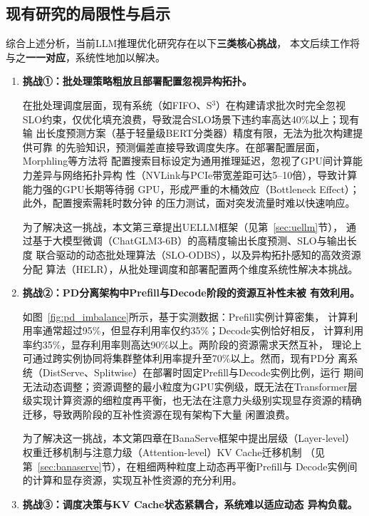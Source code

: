 \subsection{现有研究的局限性与启示}
\label{sec:limitations}

综合上述分析，当前LLM推理优化研究存在以下\textbf{三类核心挑战}，
本文后续工作将与之\textbf{一一对应}，系统性地加以解决。

\begin{enumerate}

\item \textbf{挑战①：批处理策略粗放且部署配置忽视异构拓扑。}

在批处理调度层面，现有系统（如FIFO、S$^3$）在构建请求批次时完全忽视
SLO约束，仅优化填充浪费，导致混合SLO场景下违约率高达40\%以上；现有输
出长度预测方案（基于轻量级BERT分类器）精度有限，无法为批次构建提供可靠
的先验知识，预测偏差直接导致调度失序。在部署配置层面，Morphling等方法将
配置搜索目标设定为通用推理延迟，忽视了GPU间计算能力差异与网络拓扑异构
性（NVLink与PCIe带宽差距可达5--10倍），导致计算能力强的GPU长期等待弱
GPU，形成严重的木桶效应（Bottleneck Effect）；此外，配置搜索需耗时数分钟
的压力测试，面对突发流量时难以快速响应。

为了解决这一挑战，本文第三章提出UELLM框架（见第~\ref{sec:uellm}节），
通过基于大模型微调（ChatGLM3-6B）的高精度输出长度预测、SLO与输出长度
联合驱动的动态批处理算法（SLO-ODBS），以及异构拓扑感知的高效资源分配
算法（HELR），从批处理调度和部署配置两个维度系统性解决本挑战。

\item \textbf{挑战②：PD分离架构中Prefill与Decode阶段的资源互补性未被
有效利用。}

如图~\ref{fig:pd_imbalance}所示，基于实测数据：Prefill实例计算密集，
计算利用率通常超过95\%，但显存利用率仅约35\%；Decode实例恰好相反，
计算利用率约35\%，显存利用率则高达90\%以上。两阶段的资源需求天然互补，
理论上可通过跨实例协同将集群整体利用率提升至70\%以上。然而，现有PD分
离系统（DistServe、Splitwise）在部署时固定Prefill与Decode实例比例，运行
期间无法动态调整；资源调整的最小粒度为GPU实例级，既无法在Transformer层
级实现计算资源的细粒度再平衡，也无法在注意力头级别实现显存资源的精确迁移，导致两阶段的互补性资源在现有架构下大量
闲置浪费。

为了解决这一挑战，本文第四章在BanaServe框架中提出层级（Layer-level）
权重迁移机制与注意力级（Attention-level）KV Cache迁移机制
（见第~\ref{sec:banaserve}节），在粗细两种粒度上动态再平衡Prefill与
Decode实例间的计算和显存资源，实现互补性资源的充分利用。

\item \textbf{挑战③：调度决策与KV Cache状态紧耦合，系统难以适应动态
异构负载。}


\end{enumerate}
